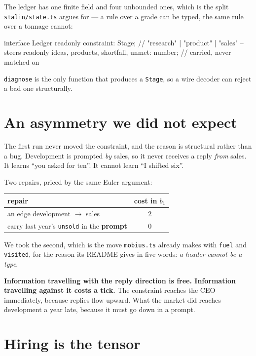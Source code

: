 \documentclass[11pt,a4paper]{article}
\begin{document}
The ledger has one finite field and four unbounded ones, which is the split
\texttt{stalin/state.ts} argues for --- a rule over a grade can be typed, the
same rule over a tonnage cannot:

\begin{term}
interface Ledger {
  readonly constraint: Stage;   // "research" | "product" | "sales" -- steers
  readonly ideas, products, shortfall, unmet: number;   // carried, never matched on
}
\end{term}

\texttt{diagnose} is the only function that produces a \texttt{Stage}, so a wire
decoder can reject a bad one structurally.

\section{An asymmetry we did not expect}

The first run never moved the constraint, and the reason is structural rather
than a bug. Development is prompted \emph{by} sales, so it never receives a
reply \emph{from} sales. It learns ``you asked for ten''. It cannot learn ``I
shifted six''.

Two repairs, priced by the same Euler argument:

\begin{center}
\begin{tabular}{@{}lc@{}}
\toprule
repair & cost in $b_1$ \\
\midrule
an edge development $\to$ sales & 2 \\
carry last year's \texttt{unsold} in the \textbf{prompt} & 0 \\
\bottomrule
\end{tabular}
\end{center}

We took the second, which is the move \texttt{mobius.ts} already makes with
\texttt{fuel} and \texttt{visited}, for the reason its README gives in five
words: \emph{a header cannot be a type}.

\begin{sectionbox}
\textbf{Information travelling with the reply direction is free. Information
travelling against it costs a tick.} The constraint reaches the CEO immediately,
because replies flow upward. What the market did reaches development a year
late, because it must go down in a prompt.
\end{sectionbox}

\section{Hiring is the tensor}
\end{document}
